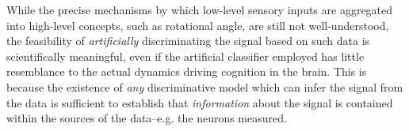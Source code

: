 

While the precise mechanisms by which low-level sensory inputs are
aggregated into high-level concepts, such as rotational angle, are
still not well-understood, the feasibility of \emph{artificially}
discriminating the signal based on such data is scientifically
meaningful, even if the artificial classifier employed has little
resemblance to the actual dynamics driving cognition in the brain.  %
This is because the existence of
\emph{any} discriminative model which can infer the signal from the
data is sufficient to establish that \emph{information} about the
signal is contained within the sources of the data--e.g. the neurons
measured.




